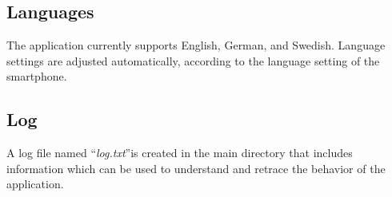 \documentclass[11pt,a4paper,titlepage]{article}
\begin{document}
\subsection{Languages}

The application currently supports English, German, and Swedish. Language settings are adjusted automatically, according to the language setting of the smartphone.


\subsection{Log}


A log file named ``\textit{log.txt}''is created in the main directory that includes information which can be used to understand and retrace the behavior of the application. 

\newpage
\end{document}
